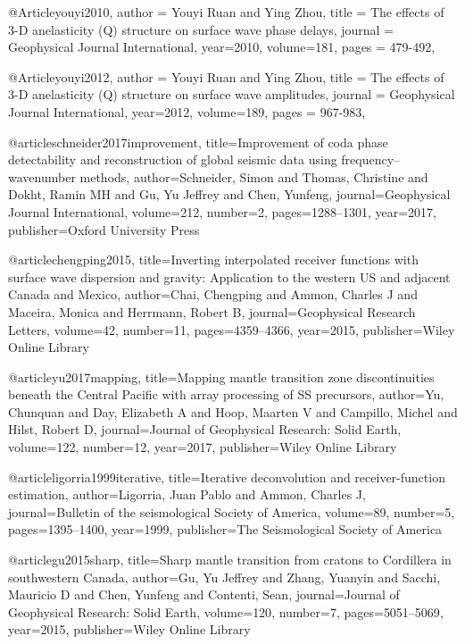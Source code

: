 @Article{youyi2010,
  author =	 {Youyi Ruan and Ying Zhou},
  title =	 {The effects of 3-D anelasticity (Q) structure on surface wave phase delays},
  journal =	 {Geophysical Journal International},
  year=2010,
  volume=181,
  pages =	 {479-492},
}

@Article{youyi2012,
  author =	 {Youyi Ruan and Ying Zhou},
  title =	 {The effects of 3-D anelasticity (Q) structure on surface wave amplitudes},
  journal =	 {Geophysical Journal International},
  year=2012,
  volume=189,
  pages =	 {967-983},
}

@article{schneider2017improvement,
  title={Improvement of coda phase detectability and reconstruction of global seismic data using frequency--wavenumber methods},
  author={Schneider, Simon and Thomas, Christine and Dokht, Ramin MH and Gu, Yu Jeffrey and Chen, Yunfeng},
  journal={Geophysical Journal International},
  volume={212},
  number={2},
  pages={1288--1301},
  year={2017},
  publisher={Oxford University Press}
}


@article{chengping2015,
  title={Inverting interpolated receiver functions with surface wave dispersion and gravity: Application to the western US and adjacent Canada and Mexico},
  author={Chai, Chengping and Ammon, Charles J and Maceira, Monica and Herrmann, Robert B},
  journal={Geophysical Research Letters},
  volume={42},
  number={11},
  pages={4359--4366},
  year={2015},
  publisher={Wiley Online Library}
}

@article{yu2017mapping,
  title={Mapping mantle transition zone discontinuities beneath the Central Pacific with array processing of SS precursors},
  author={Yu, Chunquan and Day, Elizabeth A and Hoop, Maarten V and Campillo, Michel and Hilst, Robert D},
  journal={Journal of Geophysical Research: Solid Earth},
  volume={122},
  number={12},
  year={2017},
  publisher={Wiley Online Library}
}

@article{ligorria1999iterative,
  title={Iterative deconvolution and receiver-function estimation},
  author={Ligorria, Juan Pablo and Ammon, Charles J},
  journal={Bulletin of the seismological Society of America},
  volume={89},
  number={5},
  pages={1395--1400},
  year={1999},
  publisher={The Seismological Society of America}
}

@article{gu2015sharp,
  title={Sharp mantle transition from cratons to Cordillera in southwestern Canada},
  author={Gu, Yu Jeffrey and Zhang, Yuanyin and Sacchi, Mauricio D and Chen, Yunfeng and Contenti, Sean},
  journal={Journal of Geophysical Research: Solid Earth},
  volume={120},
  number={7},
  pages={5051--5069},
  year={2015},
  publisher={Wiley Online Library}
}



